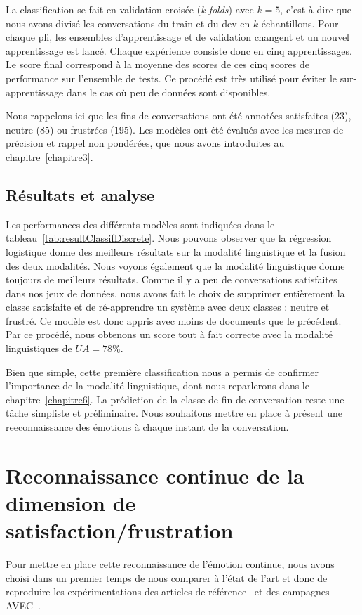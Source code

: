 La classification se fait en validation croisée (\textit{k-folds}) avec $k=5$, c'est à dire que nous avons divisé les conversations du train et du dev en $k$ échantillons. Pour chaque pli, les ensembles d'apprentissage et de validation changent et un nouvel apprentissage est lancé. Chaque expérience consiste donc en cinq apprentissages. Le score final correspond à la moyenne des scores de ces cinq scores de performance sur l'ensemble de tests. %
Ce procédé est très utilisé pour éviter le sur-apprentissage dans le cas où peu de données sont disponibles.

Nous rappelons ici que les fins de conversations ont été annotées satisfaites (23), neutre (85) ou frustrées (195).
Les modèles ont été évalués avec les mesures de précision et rappel non pondérées, que nous avons introduites au chapitre~\ref{chapitre3}.

\subsection{Résultats et analyse}



Les  performances des différents modèles sont indiquées dans le tableau~\ref{tab:resultClassifDiscrete}. Nous pouvons observer que la régression logistique donne des meilleurs résultats sur la modalité linguistique et la fusion des deux modalités. Nous voyons également que la modalité linguistique donne toujours de meilleurs résultats. Comme il y a peu de conversations satisfaites dans nos jeux de données, nous avons fait le choix de supprimer entièrement la classe satisfaite et de ré-apprendre un système avec deux classes : neutre et frustré. Ce modèle est donc appris avec moins de documents que le précédent. Par ce procédé, nous obtenons un score tout à fait correcte avec la modalité linguistiques de $UA=78\%$.

Bien que simple, cette première classification nous a permis de confirmer l'importance de la modalité linguistique, dont nous reparlerons dans le chapitre~\ref{chapitre6}.
La prédiction de la classe de fin de conversation reste une tâche simpliste et préliminaire. Nous souhaitons mettre en place à présent une reeconnaissance des émotions à chaque instant de la conversation.

\section{Reconnaissance continue de la dimension de satisfaction/frustration}
\label{sec:5.3}
Pour mettre en place cette reconnaissance de l'émotion continue, nous avons choisi dans un premier temps de nous comparer à l'état de l'art et donc de reproduire les expérimentations des articles de référence~\cite{Schmitt2019,SEWA} et des campagnes AVEC~\cite{AVEC2017,AVEC2018,AVEC2019}.

